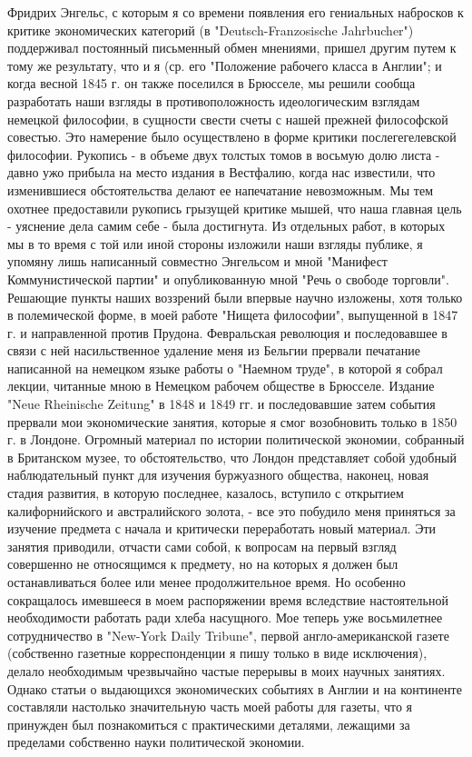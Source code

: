 \documentclass[12pt]{article}
\newcommand{\parnum}{(\arabic{parcount})}
\newcounter{parcount}
\newenvironment{parnumbers}{%
  \par%
  \everypar{\noindent \stepcounter{parcount}\marginpar[]{\parnum}}%
}{}
\begin{document}
\begin{parnumbers}
    Фридрих Энгельс, с которым я со времени появления его гениальных набросков к критике экономических категорий (в "Deutsch-Franzosische Jahrbucher") поддерживал постоянный письменный обмен мнениями, пришел другим путем к тому же результату, что и я (ср. его "Положение рабочего класса в Англии"; и когда весной 1845 г. он также поселился в Брюсселе, мы решили сообща разработать наши взгляды в противоположность идеологическим взглядам немецкой философии, в сущности свести счеты с нашей прежней философской совестью. Это намерение было осуществлено в форме критики послегегелевской философии. Рукопись - в объеме двух толстых томов в восьмую долю листа - давно ужо прибыла на место издания в Вестфалию, когда нас известили, что изменившиеся обстоятельства делают ее напечатание невозможным. Мы тем охотнее предоставили рукопись грызущей критике мышей, что наша главная цель - уяснение дела самим себе - была достигнута. Из отдельных работ, в которых мы в то время с той или иной стороны изложили наши взгляды публике, я упомяну лишь написанный совместно Энгельсом и мной "Манифест Коммунистической партии" и опубликованную мной "Речь о свободе торговли". Решающие пункты наших воззрений были впервые научно изложены, хотя только в полемической форме, в моей работе "Нищета философии", выпущенной в 1847 г. и направленной против Прудона. Февральская революция и последовавшее в связи с ней насильственное удаление меня из Бельгии прервали печатание написанной на немецком языке работы о "Наемном труде", в которой я собрал лекции, читанные мною в Немецком рабочем обществе в Брюсселе. Издание "Neue Rheinische Zeitung" в 1848 и 1849 гг. и последовавшие затем события прервали мои экономические занятия, которые я смог возобновить только в 1850 г. в Лондоне. Огромный материал по истории политической экономии, собранный в Британском музее, то обстоятельство, что Лондон представляет собой удобный наблюдательный пункт для изучения буржуазного общества, наконец, новая стадия развития, в которую последнее, казалось, вступило с открытием калифорнийского и австралийского золота, - все это побудило меня приняться за изучение предмета с начала и критически переработать новый материал. Эти занятия приводили, отчасти сами собой, к вопросам на первый взгляд совершенно не относящимся к предмету, но на которых я должен был останавливаться более или менее продолжительное время. Но особенно сокращалось имевшееся в моем распоряжении время вследствие настоятельной необходимости работать ради хлеба насущного. Мое теперь уже восьмилетнее сотрудничество в "New-York Daily Tribune", первой англо-американской газете (собственно газетные корреспонденции я пишу только в виде исключения), делало необходимым чрезвычайно частые перерывы в моих научных занятиях. Однако статьи о выдающихся экономических событиях в Англии и на континенте составляли настолько значительную часть моей работы для газеты, что я принужден был познакомиться с практическими деталями, лежащими за пределами собственно науки политической экономии.


\end{parnumbers}
\end{document}
